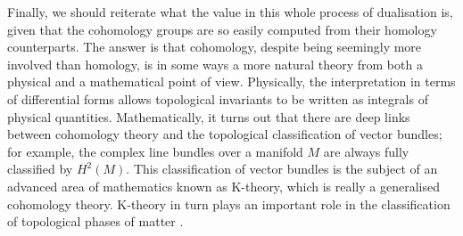Finally, we should reiterate what the value in this whole process of dualisation is, given that the cohomology groups are so easily computed from their homology counterparts. The answer is that cohomology, despite being seemingly more involved than homology, is in some ways a more natural theory from both a physical and a mathematical point of view. Physically, the interpretation in terms of differential forms allows topological invariants to be written as integrals of physical quantities. Mathematically, it turns out that there are deep links between cohomology theory and the topological classification of vector bundles; for example, the complex line bundles over a manifold $M$ are always fully classified by $H^2(M)$. This classification of vector bundles is the subject of an advanced area of mathematics known as K-theory, which is really a generalised cohomology theory. K-theory in turn plays an important role in the classification of topological phases of matter \cite{FreedMoore_K-theory,Thiang_K-theory}.